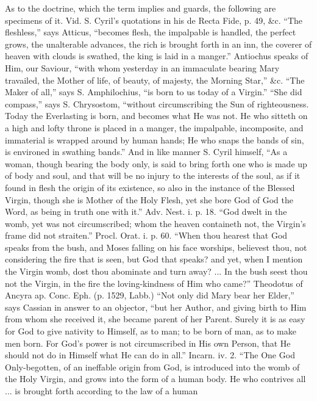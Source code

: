 As to the doctrine, which the term implies and
guards, the following are specimens of it. Vid. S. Cyril's quotations
in his de Recta Fide, p. 49, \&c. ``The fleshless,'' says Atticus, ``becomes
flesh, the impalpable is handled, the perfect grows, the unalterable
advances, the rich is brought forth in an inn, the coverer of heaven
with clouds is swathed, the king is laid in a manger.'' Antiochus
speaks of Him, our Saviour, ``with whom yesterday in an immaculate
bearing Mary travailed, the Mother of life, of beauty, of majesty, the
Morning Star,'' \&c. ``The Maker of all,'' says S. Amphilochius, ``is
born to us today of a Virgin.'' ``She did compass,'' says S. Chrysostom, ``without
circumscribing the Sun of righteousness. Today the Everlasting is
born, and becomes what He was not. He who sitteth on a high and lofty
throne is placed in a manger, the impalpable, incomposite, and
immaterial is wrapped around by human hands; He who snaps the bands of
sin, is environed in swathing bands.'' And in like manner S. Cyril
himself, ``As a woman, though bearing the body only, is said to bring
forth one who is made up of body and soul, and that will be no injury
to the interests of the soul, as if it found in flesh the origin of
its existence, so also in the instance of the Blessed Virgin, though
she is Mother of the Holy Flesh, yet she bore God of God the Word, as
being in truth one with it.'' Adv. Nest. i. p. 18. ``God dwelt in the
womb, yet was not circumscribed; whom the heaven containeth not, the
Virgin's frame did not straiten.'' Procl. Orat. i. p. 60.
``When thou hearest that God speaks from the bush, and Moses
falling on his face worships, believest thou, not considering the fire
that is seen, but God that speaks? and yet, when I mention the Virgin
womb, dost thou abominate and turn away? ... In the bush seest thou
not the Virgin, in the fire the loving-kindness of Him who came?''
Theodotus of Ancyra ap. Conc. Eph. (p. 1529, Labb.) ``Not only did Mary
bear her Elder,'' says Cassian in answer to an objector, ``but her
Author, and giving birth to Him from whom she received it, she became
parent of her Parent. Surely it is as easy for God to give nativity to
Himself, as to man; to be born of man, as to make men born. For God's
power is not circumscribed in His own Person, that He should not do in
Himself what He can do in all.'' Incarn. iv. 2. ``The One God
Only-begotten, of an ineffable origin from God, is introduced into the
womb of the Holy Virgin, and grows into the form of a human body. He
who contrives all ... is brought forth according to the law of a human
